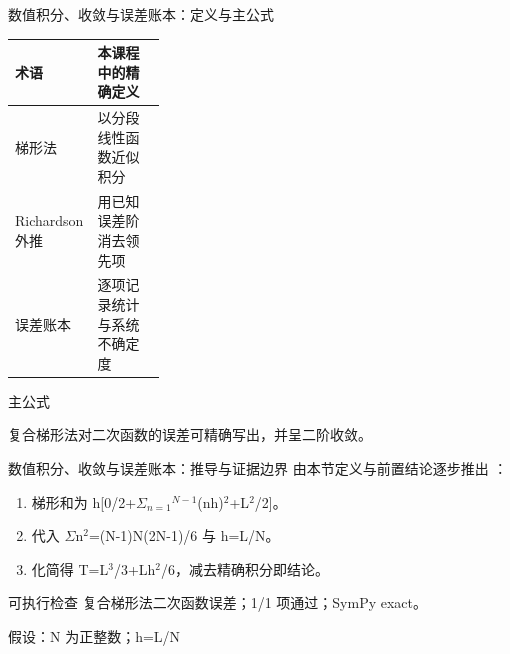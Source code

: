 \begin{frame}[t]{数值积分、收敛与误差账本：定义与主公式}
\footnotesize\begin{tabularx}{\linewidth}{p{0.30\linewidth}Y}
\toprule 术语 & 本课程中的精确定义\\\midrule
{} 梯形法 & 以分段线性函数近似积分\\
 Richardson 外推 & 用已知误差阶消去领先项\\
 误差账本 & 逐项记录统计与系统不确定度\\
\bottomrule\end{tabularx}\vspace{0.15cm}
\begin{block}{ 主公式}\centering{}\end{block}
复合梯形法对二次函数的误差可精确写出，并呈二阶收敛。
\end{frame}

\begin{frame}[t]{数值积分、收敛与误差账本：推导与证据边界}
\footnotesize
{}\quad 由本节定义与前置结论逐步推出 ：
\begin{enumerate}
\item 梯形和为 h[0/\allowbreak{}2+\ensuremath{\Sigma}\ensuremath{_{n=1}}\ensuremath{^{N-1}}(nh)\ensuremath{^{2}}+L\ensuremath{^{2}}/\allowbreak{}2]。
\item 代入 \ensuremath{\Sigma}n\ensuremath{^{2}}=(N-1)N(2N-1)/\allowbreak{}6 与 h=L/\allowbreak{}N。
\item 化简得 T=L\ensuremath{^{3}}/\allowbreak{}3+Lh\ensuremath{^{2}}/\allowbreak{}6，减去精确积分即结论。
\end{enumerate}\begin{block}{可执行检查}
\quad 复合梯形法二次函数误差；1/1 项通过；SymPy exact。
\par\scriptsize 假设：N 为正整数；h=L/\allowbreak{}N
\end{block}
\end{frame}

